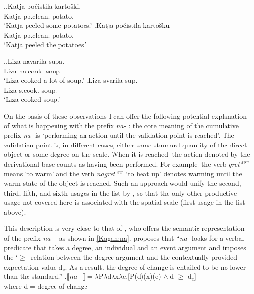 \ex.\label{ex:na:po}\ag.\label{ex:na:po:gen}Katja po\v{c}istila karto\v{s}ki.\\
Katja po.clean. potato.\\
\trans `Katja peeled some potatoes.'
\bg.\label{ex:na:po:acc}Katja po\v{c}istila karto\v{s}ku.\\
Katja po.clean. potato.\\
\trans `Katja peeled the potatoes.'

\ex.\ag.\label{ex:navarit}Liza navarila supa.\\
Liza na.cook. soup.\\
\trans `Liza cooked a lot of soup.'
\bg.\label{ex:svarit}Liza svarila sup.\\
Liza s.cook. soup.\\
\trans `Liza cooked soup.'

On the basis of these observations I can offer the following potential explanation of what is happening with the prefix \textit{na-}  : the core meaning of the cumulative  prefix \textit{na-}   is `performing an action until the validation point is reached'. The validation point is, in different cases, either some standard quantity of the direct object or some degree on the scale. When it is reached, the action denoted by the derivational base counts as having been performed. For example, the verb \textit{gret'}$^{\textsc{ipf}}$ means `to warm' and the verb \textit{nagret'}$^{\textsc{pf}}$ `to heat up' denotes warming until the warm state of the object is reached. Such an approach would unify the second, third, fifth, and sixth usages in the list by \citet{Shvedova:82}, so that the only other productive usage not covered here is associated with the spatial  scale (first usage in the list above). 

This description is very close to that of \citet{Kagan:book}, who offers the semantic representation of the prefix \textit{na-}  , as shown in \ref{Kagan:na}. \citet[55]{Kagan:book} proposes that ``\textit{na}- looks for a verbal predicate that takes a degree, an individual and an event argument and imposes the `$\geqslant$' relation between the degree argument and the contextually provided   expectation value d$_c$. As a result, the degree of change is entailed to be no lower than the standard.''
\ex.\label{Kagan:na}$\llbracket na- \rrbracket = \lambda$P$\lambda$d$\lambda$x$\lambda$e.[P(d)(x)(e) $\wedge$ d $\geqslant$ d$_c$]\\
where d = degree of change \citep{KennedyLevin:02}\\

